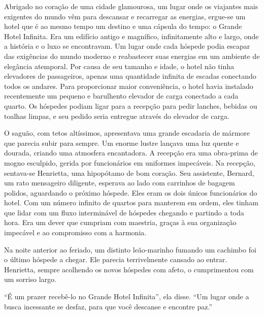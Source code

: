 \vspace{-2em}
Abrigado no coração de uma cidade glamourosa, um lugar onde os viajantes mais exigentes do mundo vêm para descansar e recarregar as energias, ergue-se um hotel que é ao mesmo tempo um destino e uma cápsula do tempo: o Grande Hotel Infinita. Era um edifício antigo e magnífico, infinitamente alto e largo, onde a história e o luxo se encontravam. Um lugar onde cada hóspede podia escapar das exigências do mundo moderno e reabastecer suas energias em um ambiente de elegância atemporal. Por causa de seu tamanho e idade, o hotel não tinha elevadores de passageiros, apenas uma quantidade infinita de escadas conectando todos os andares. Para proporcionar maior conveniência, o hotel havia instalado recentemente um pequeno e barulhento elevador de carga conectado a cada quarto. Os hóspedes podiam ligar para a recepção para pedir lanches, bebidas ou toalhas limpas, e seu pedido seria entregue através do elevador de carga.

O saguão, com tetos altíssimos, apresentava uma grande escadaria de mármore que parecia subir para sempre. Um enorme lustre lançava uma luz quente e dourada, criando uma atmosfera encantadora. A recepção era uma obra-prima de mogno esculpido, gerida por funcionários em uniformes impecáveis. Na recepção, sentava-se Henrietta, uma hipopótamo de bom coração. Seu assistente, Bernard, um rato mensageiro diligente, esperava ao lado com carrinhos de bagagem polidos, aguardando o próximo hóspede. Eles eram os dois únicos funcionários do hotel. Com um número infinito de quartos para manterem em ordem, eles tinham que lidar com um fluxo interminável de hóspedes chegando e partindo a toda hora. Era um dever que cumpriam com maestria, graças à sua organização impecável e ao compromisso com a harmonia.

\clearpage


Na noite anterior ao feriado, um distinto leão-marinho fumando um cachimbo foi o último hóspede a chegar. Ele parecia terrivelmente cansado ao entrar. Henrietta, sempre acolhendo os novos hóspedes com afeto, o cumprimentou com um sorriso largo.

``É um prazer recebê-lo no Grande Hotel Infinita'', ela disse. ``Um lugar onde a busca incessante se desfaz, para que você descanse e encontre paz.''

